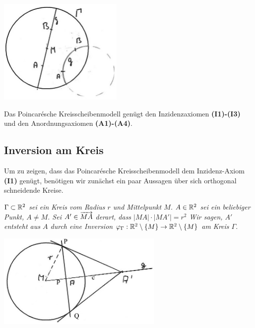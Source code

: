 \centerline{\includegraphics[width=6cm]{BILDER/4-2-04b-Geraden.jpg}}



\begin{thm} \label{thm:PoincareKreisscheibe}
Das Poincar\'esche Kreisscheibenmodell gen\"{u}gt den Inzidenzaxiomen
{\bf (I1)-(I3)}
und den Anordnungsaxiomen {\bf (A1)-(A4)}.
\end{thm}





\subsection*{Inversion am Kreis}



Um zu zeigen, dass das Poincar\'esche Kreisscheibenmodell dem
Inzidenz-Axiom {\bf (I1)} genügt, benötigen wir zunächst ein paar
Aussagen über sich orthogonal schneidende Kreise.



\begin{defi}
\emph{$\Gamma\subset \mathbb R^2$ sei ein Kreis vom Radius $r$ und Mittelpunkt $M$.
$A\in\mathbb R^2$ sei ein beliebiger Punkt, $A\neq M$. Sei
$A'\in\mbox{${\overrightarrow{MA}}$}$ derart, dass $|MA|\cdot|MA'|=r^2$ 
Wir sagen, $A'$ entsteht aus $A$ durch
eine \emph{Inversion} $\varphi_\Gamma : \mathbb R^2\setminus\{M\} \to \mathbb R^2\setminus\{M\}$ am Kreis $\Gamma$}.\\
\end{defi}




\centerline{\includegraphics[width=8cm]{BILDER/4-2-01-Inversion.jpg}}


